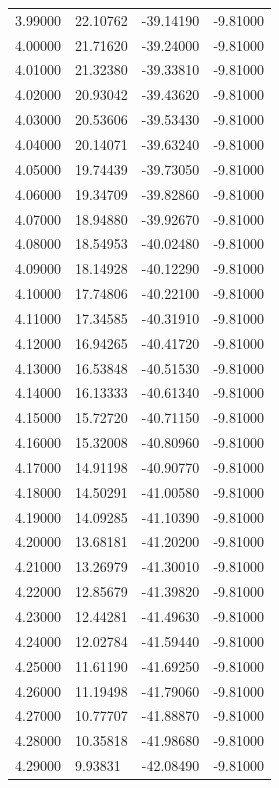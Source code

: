 \begin{table}
\begin{tabular}{llll}
3.99000 & 22.10762 & -39.14190 & -9.81000 \\
4.00000 & 21.71620 & -39.24000 & -9.81000 \\
4.01000 & 21.32380 & -39.33810 & -9.81000 \\
4.02000 & 20.93042 & -39.43620 & -9.81000 \\
4.03000 & 20.53606 & -39.53430 & -9.81000 \\
4.04000 & 20.14071 & -39.63240 & -9.81000 \\
4.05000 & 19.74439 & -39.73050 & -9.81000 \\
4.06000 & 19.34709 & -39.82860 & -9.81000 \\
4.07000 & 18.94880 & -39.92670 & -9.81000 \\
4.08000 & 18.54953 & -40.02480 & -9.81000 \\
4.09000 & 18.14928 & -40.12290 & -9.81000 \\
4.10000 & 17.74806 & -40.22100 & -9.81000 \\
4.11000 & 17.34585 & -40.31910 & -9.81000 \\
4.12000 & 16.94265 & -40.41720 & -9.81000 \\
4.13000 & 16.53848 & -40.51530 & -9.81000 \\
4.14000 & 16.13333 & -40.61340 & -9.81000 \\
4.15000 & 15.72720 & -40.71150 & -9.81000 \\
4.16000 & 15.32008 & -40.80960 & -9.81000 \\
4.17000 & 14.91198 & -40.90770 & -9.81000 \\
4.18000 & 14.50291 & -41.00580 & -9.81000 \\
4.19000 & 14.09285 & -41.10390 & -9.81000 \\
4.20000 & 13.68181 & -41.20200 & -9.81000 \\
4.21000 & 13.26979 & -41.30010 & -9.81000 \\
4.22000 & 12.85679 & -41.39820 & -9.81000 \\
4.23000 & 12.44281 & -41.49630 & -9.81000 \\
4.24000 & 12.02784 & -41.59440 & -9.81000 \\
4.25000 & 11.61190 & -41.69250 & -9.81000 \\
4.26000 & 11.19498 & -41.79060 & -9.81000 \\
4.27000 & 10.77707 & -41.88870 & -9.81000 \\
4.28000 & 10.35818 & -41.98680 & -9.81000 \\
4.29000 & 9.93831 & -42.08490 & -9.81000 \\

\end{tabular}
\end{table}
